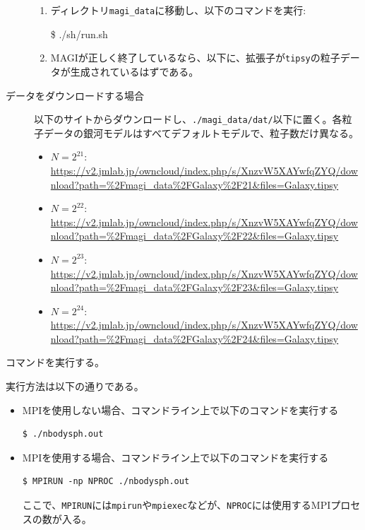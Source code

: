 \begin{description}
\begin{enumerate}
\item ディレクトリ\texttt{magi\_data}に移動し、以下のコマンドを実行:
\begin{screen}
\$ ./sh/run.sh
\end{screen}
\item \textsc{MAGI}が正しく終了しているなら、以下に、拡張子が\texttt{tipsy}の粒子データが生成されているはずである。
\end{enumerate}
\item[データをダウンロードする場合]  以下のサイトからダウンロードし、\texttt{./magi\_data/dat/}以下に置く。各粒子データの銀河モデルはすべてデフォルトモデルで、粒子数だけ異なる。
\begin{itemize}
\item $N=2^{21}$: \url{https://v2.jmlab.jp/owncloud/index.php/s/XnzvW5XAYwfqZYQ/download?path=%2Fmagi_data%2FGalaxy%2F21&files=Galaxy.tipsy}
\item $N=2^{22}$: \url{https://v2.jmlab.jp/owncloud/index.php/s/XnzvW5XAYwfqZYQ/download?path=%2Fmagi_data%2FGalaxy%2F22&files=Galaxy.tipsy}
\item $N=2^{23}$: \url{https://v2.jmlab.jp/owncloud/index.php/s/XnzvW5XAYwfqZYQ/download?path=%2Fmagi_data%2FGalaxy%2F23&files=Galaxy.tipsy}
\item $N=2^{24}$: \url{https://v2.jmlab.jp/owncloud/index.php/s/XnzvW5XAYwfqZYQ/download?path=%2Fmagi_data%2FGalaxy%2F24&files=Galaxy.tipsy}
\end{itemize}
\end{description}

\label{s3sec:NbodySPH_make}
コマンドを実行する。

\label{s3sec:NbodySPH_execution}
実行方法は以下の通りである。
\begin{itemize}
\item MPIを使用しない場合、コマンドライン上で以下のコマンドを実行する
\begin{screen}
\begin{verbatim}
$ ./nbodysph.out
\end{verbatim}
\end{screen}
  
\item MPIを使用する場合、コマンドライン上で以下のコマンドを実行する
\begin{screen}
\begin{verbatim}
$ MPIRUN -np NPROC ./nbodysph.out
\end{verbatim}
\end{screen}
ここで、\texttt{MPIRUN}には\texttt{mpirun}や\texttt{mpiexec}などが、\texttt{NPROC}には使用するMPIプロセスの数が入る。
\end{itemize}

